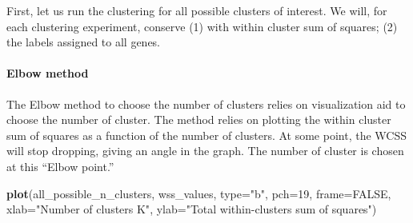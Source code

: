 \documentclass[9pt,a4paper,]{extarticle}
\newenvironment{Shaded}{\begin{snugshade}}{\end{snugshade}}
\newcommand{\ControlFlowTok}[1]{\textcolor[rgb]{0.13,0.29,0.53}{\textbf{#1}}}
\newcommand{\DataTypeTok}[1]{\textcolor[rgb]{0.13,0.29,0.53}{#1}}
\newcommand{\DecValTok}[1]{\textcolor[rgb]{0.00,0.00,0.81}{#1}}
\newcommand{\KeywordTok}[1]{\textcolor[rgb]{0.13,0.29,0.53}{\textbf{#1}}}
\newcommand{\NormalTok}[1]{#1}
\newcommand{\OperatorTok}[1]{\textcolor[rgb]{0.81,0.36,0.00}{\textbf{#1}}}
\newcommand{\OtherTok}[1]{\textcolor[rgb]{0.56,0.35,0.01}{#1}}
\newcommand{\StringTok}[1]{\textcolor[rgb]{0.31,0.60,0.02}{#1}}
\begin{document}
First, let us run the clustering for all possible clusters of interest. We
will, for each clustering experiment, conserve (1) with within cluster sum of
squares; (2) the labels assigned to all genes.

\begin{Shaded}
\end{Shaded}

\hypertarget{elbow-method}{%
\paragraph{Elbow method}\label{elbow-method}}

The Elbow method to choose the number of clusters relies on visualization aid
to choose the number of cluster. The method relies on plotting the within
cluster sum of squares as a function of the number of clusters. At some point,
the WCSS will stop dropping, giving an angle in the graph. The number of
cluster is chosen at this ``Elbow point.''

\begin{Shaded}
\begin{Highlighting}[]
\KeywordTok{plot}\NormalTok{(all_possible_n_clusters, wss_values,}
     \DataTypeTok{type=}\StringTok{"b"}\NormalTok{, }\DataTypeTok{pch=}\DecValTok{19}\NormalTok{, }\DataTypeTok{frame=}\OtherTok{FALSE}\NormalTok{, }
     \DataTypeTok{xlab=}\StringTok{"Number of clusters K"}\NormalTok{,}
     \DataTypeTok{ylab=}\StringTok{"Total within-clusters sum of squares"}\NormalTok{)}
\end{Highlighting}
\end{Shaded}
\end{document}
